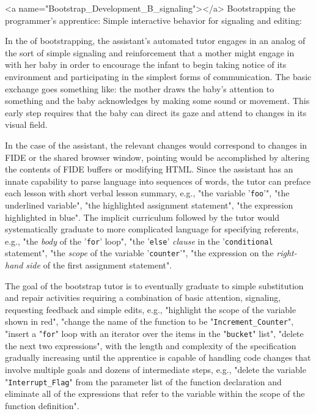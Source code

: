 \rawhtml
<a name="Bootstrap_Development_B_signaling"></a>
\endrawhtml
Bootstrapping the programmer's apprentice: Simple interactive behavior for signaling and editing:

In the {} of bootstrapping, the assistant's automated tutor engages in an analog of the sort of simple signaling and reinforcement that a mother might engage in with her baby in order to encourage the infant to begin taking notice of its environment and participating in the simplest forms of communication. The basic exchange goes something like: the mother draws the baby's attention to something and the baby acknowledges by making some sound or movement. This early step requires that the baby can direct its gaze and attend to changes in its visual field.

In the case of the assistant, the relevant changes would correspond to changes in FIDE or the shared browser window, pointing would be accomplished by altering the contents of FIDE buffers or modifying HTML. Since the assistant has an innate capability to parse language into sequences of words, the tutor can preface each lesson with short verbal lesson summary, e.g., "the variable '{\tt{foo}}'", "the underlined variable", "the highlighted assignment statement", "the expression highlighted in blue". The implicit curriculum followed by the tutor would systematically graduate to more complicated language for specifying referents, e.g., "the {\it{body}} of the '{\tt{for}}' loop", "the '{\tt{else}}' {\it{clause}} in the '{\tt{conditional}} statement", "the {\it{scope}} of the variable '{\tt{counter}}'", "the expression on the {\it{right-hand side}} of the first assignment statement".

The goal of the bootstrap tutor is to eventually graduate to simple substitution and repair activities requiring a combination of basic attention, signaling, requesting feedback and simple edits, e.g., "highlight the scope of the variable shown in red", "change the name of the function to be "{\tt{Increment\_Counter}}", "insert a "{\tt{for}}" loop with an iterator over the items in the "{\tt{bucket}}" list", "delete the next two expressions", with the length and complexity of the specification gradually increasing until the apprentice is capable of handling code changes that involve multiple goals and dozens of intermediate steps, e.g., "delete the variable "{\tt{Interrupt\_Flag}}" from the parameter list of the function declaration and eliminate all of the expressions that refer to the variable within the scope of the function definition".

